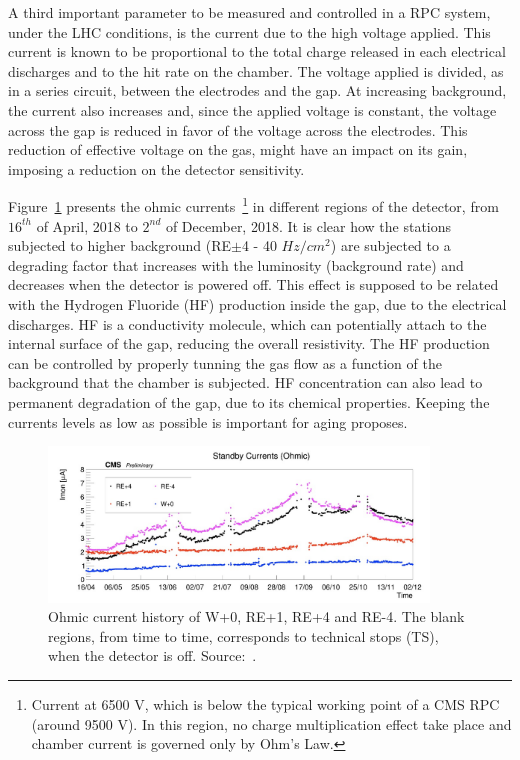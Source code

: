 A third important parameter to be measured and controlled in a RPC system, under the LHC conditions, is the current due to the high voltage applied. This current is known to be proportional to the total charge released in each electrical discharges and to the hit rate on the chamber. The voltage applied is divided, as in a series circuit, between the electrodes and the gap. At increasing background, the current also increases and, since the applied voltage is constant, the voltage across the gap is reduced in favor of the voltage across the electrodes. This reduction of effective voltage on the gas, might have an impact on its gain, imposing a reduction on the detector sensitivity.

Figure~\ref{cms_run2_currents} presents the ohmic currents~\footnote{Current at 6500 V, which is below the typical working point of a CMS RPC (around 9500 V). In this region, no charge multiplication effect take place and chamber current is governed only by Ohm's Law.} in different regions of the detector, from $16^{th}$ of April, 2018 to $2^{nd}$ of December, 2018. It is clear how the stations subjected to higher background (RE$\pm$4 - 40 $Hz/cm^2$) are subjected to a degrading factor that increases with the luminosity (background rate) and decreases when the detector is powered off. This effect is supposed to be related with the Hydrogen Fluoride (HF) production inside the gap, due to the electrical discharges. HF is a conductivity molecule, which can potentially attach to the internal surface of the gap, reducing the overall resistivity. The HF production can be controlled by properly tunning the gas flow as a function of the background that the chamber is subjected. HF concentration can also lead to permanent degradation of the gap, due to its chemical properties. Keeping the currents levels as low as possible is important for aging proposes. 

\begin{figure}[htbp]
    \centering
    \includegraphics[width=0.9\textwidth,keepaspectratio]{figures/rpc/performance/ohmic_current_run2.png}
    \caption{Ohmic current history of W+0, RE+1, RE+4 and RE-4. The blank regions, from time to time, corresponds to technical stops (TS), when the detector is off. Source:~\cite{rpc_run2_performance}.}
    \label{cms_run2_currents}
\end{figure}

